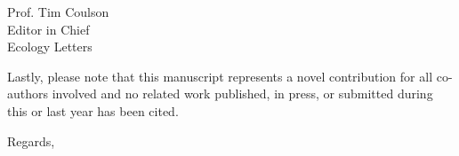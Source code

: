 \documentclass[12pt, a4paper]{letter}
\begin{document}
\begin{letter}{
       Prof. Tim Coulson\\
       Editor in Chief\\
       Ecology Letters}


Lastly, please note that this manuscript represents a novel contribution for all co-authors involved and no related work published, in press, or submitted during this or last year has been cited. 

\closing{Regards,}

\end{letter}
\end{document}
